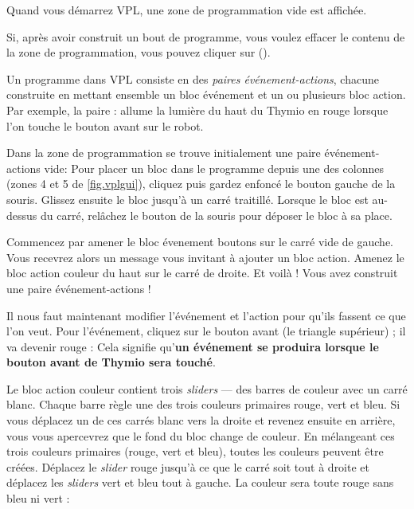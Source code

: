 \newpage


Quand vous démarrez VPL, une zone de programmation vide est affichée.

Si, après avoir construit un bout de programme, vous voulez effacer le contenu de la zone de programmation, vous pouvez cliquer sur  ().

Un programme dans VPL consiste en des \emph{paires événement-actions}, chacune construite en mettant ensemble un bloc événement et un ou plusieurs bloc action.
Par exemple, la paire :  allume la lumière du haut du Thymio en rouge lorsque l'on touche le bouton avant sur le robot.


Dans la zone de programmation se trouve initialement une paire événement-actions vide: 
Pour placer un bloc dans le programme depuis une des colonnes (zones 4 et 5 de \cref{fig.vplgui}), cliquez puis gardez enfoncé le bouton gauche de la souris.
Glissez ensuite le bloc jusqu'à un carré traitillé.
Lorsque le bloc est au-dessus du carré, relâchez le bouton de la souris pour déposer le bloc à sa place.


Commencez par amener le bloc évenement boutons  sur le carré vide de gauche.
Vous recevrez alors un message vous invitant à ajouter un bloc action.
Amenez le bloc action couleur du haut  sur le carré de droite.
Et voilà ! Vous avez construit une paire événement-actions !

Il nous faut maintenant modifier l'événement et l'action pour qu'ils fassent ce que l'on veut.
Pour l'événement, cliquez sur le bouton avant (le triangle supérieur) ; il va devenir rouge : 
Cela signifie qu'\textbf{un événement se produira lorsque le bouton avant de Thymio sera touché}.

Le bloc action couleur contient trois \textit{sliders} --- des barres de couleur avec un carré blanc.
Chaque barre règle une des trois couleurs primaires rouge, vert et bleu.
Si vous déplacez un de ces carrés blanc vers la droite et revenez ensuite en arrière,
vous vous apercevrez que le fond du bloc change de couleur.
En mélangeant ces trois couleurs primaires (rouge, vert et bleu),
toutes les couleurs peuvent être créées.
Déplacez le \textit{slider} rouge jusqu'à ce que le carré soit
tout à droite et déplacez les \textit{sliders} vert et bleu tout à gauche.
La couleur sera toute rouge sans bleu ni vert : 

